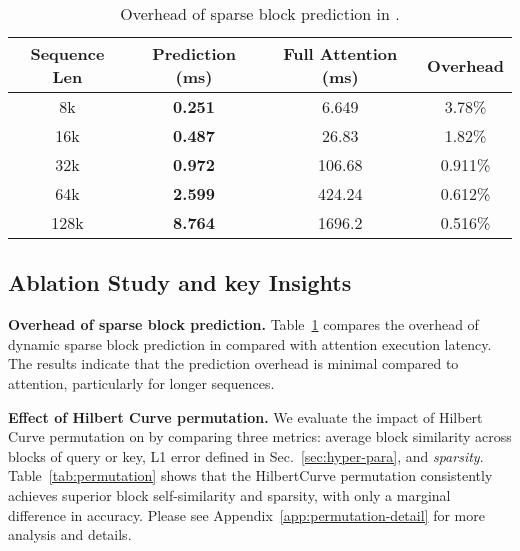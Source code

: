  


\begin{table}[h!]
    \centering
    \small
    \vspace{-1em}
    \caption{Overhead of sparse block prediction in \our.}
    \label{tab:pattern_search_overhead}
    \setlength\tabcolsep{2.4pt}
    \begin{tabular}{c|c|c|c}
        \toprule
        \textbf{Sequence Len} & \textbf{Prediction (ms)} & \textbf{Full Attention (ms)} & Overhead \\
        \midrule
        8k  & \textbf{0.251}  & 6.649 &  3.78\% \\
        16k & \textbf{0.487}  & 26.83 & 1.82\% \\
        32k & \textbf{0.972}  & 106.68 & 0.911\%\\
        64k & \textbf{2.599}  & 424.24 & 0.612\%\\
        128k & \textbf{8.764} & 1696.2 & 0.516\%\\
        \bottomrule
    \end{tabular}
    \vspace{-1.2em}
\end{table}


\subsection{Ablation Study and key Insights}


\textbf{Overhead of sparse block prediction.} Table~\ref{tab:pattern_search_overhead} compares the overhead of dynamic sparse block prediction in \our compared with attention execution latency. The results indicate that the prediction overhead is minimal compared to attention, particularly for longer sequences.


\textbf{Effect of Hilbert Curve permutation.} 
We evaluate the impact of Hilbert Curve permutation on \mochi by comparing three metrics: average block similarity across blocks of query or key, L1 error defined in Sec.~\ref{sec:hyper-para}, and \textit{sparsity}.
Table~\ref{tab:permutation} shows that the HilbertCurve permutation consistently achieves superior block self-similarity and sparsity, with only a marginal difference in accuracy.
Please see Appendix~\ref{app:permutation-detail} for more analysis and details.

